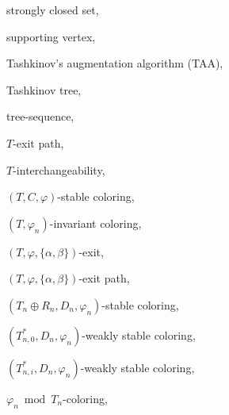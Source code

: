 \documentclass[11pt]{article}
\begin{document}
\noindent strongly closed set,~\pageref{sclosed} 

\noindent supporting vertex,~\pageref{supportingvertex}

\noindent Tashkinov's augmentation algorithm (TAA),~\pageref{TAAalgorithm}

\noindent Tashkinov tree,~\pageref{tashkinovtree}

\noindent tree-sequence,~\pageref{tsequence}

\noindent $T$-exit path,~\pageref{exitpath}

\noindent $T$-interchangeability,~\pageref{interchangable}



\noindent $(T,C,\varphi)$-stable coloring,~\pageref{tcstable}

\noindent $(T, \varphi_n)$-invariant coloring,~\pageref{tinvariant}

\noindent $(T,\varphi,\{\alpha,\beta\})$-exit,~\pageref{exit}

\noindent $(T,\varphi,\{\alpha,\beta\})$-exit path,~\pageref{tphiexitpath}  

\noindent $(T_n\oplus R_n,D_n,\varphi_n)$-stable coloring,~\pageref{trstable}

\noindent $(T_{n,0}^*, D_n,\varphi_n)$-weakly stable coloring,~\pageref{t0strong}

\noindent $(T_{n,i}^*, D_n,\varphi_n)$-weakly stable coloring,~\pageref{tistrong}

\noindent $\varphi_n \bmod T_n$-coloring,~\pageref{modcoloring}
\end{document}
